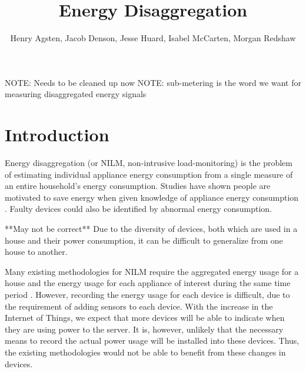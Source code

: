 \documentclass{article}
\title{Energy Disaggregation}
\author{Henry Agsten, Jacob Denson, Jesse Huard, Isabel McCarten, Morgan Redshaw}
\date{}
\begin{document}
\maketitle


NOTE: Needs to be cleaned up now
NOTE: sub-metering is the word we want for measuring disaggregated energy signals

\section{Introduction}

Energy disaggregation (or NILM, non-intrusive load-monitoring) is the problem of estimating individual appliance energy consumption from a single measure of an entire household's energy consumption.
Studies have shown people are motivated to save energy when given knowledge of appliance energy consumption \cite{Darby}.
Faulty devices could also be identified by abnormal energy consumption.


**May not be correct** Due to the diversity of devices, both which are used in a house and their power consumption, it can be difficult to generalize from one house to another.

Many existing methodologies for NILM require the aggregated energy usage for a house and the energy usage for each appliance of interest during the same time period \cite{Kelly, Cicchetti}. 
However, recording the energy usage for each device is difficult, due to the requirement of adding sensors to each device.
With the increase in the Internet of Things, we expect that more devices will be able to indicate when they are using power to the server.
It is, however, unlikely that the necessary means to record the actual power usage will be installed into these devices.
Thus, the existing methodologies would not be able to benefit from these changes in devices.
\end{document}
